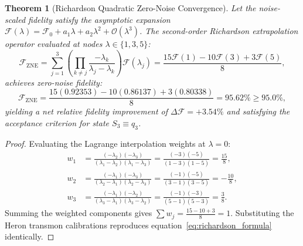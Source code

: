 \documentclass[11pt,a4paper,reqno]{article}
\theoremstyle{plain}
\newtheorem{theorem}{Theorem}[section]
\theoremstyle{definition}
\theoremstyle{remark}
\numberwithin{equation}{section}
\begin{document}
\begin{theorem}[Richardson Quadratic Zero-Noise Convergence]
\label{thm:zne_convergence}
Let the noise-scaled fidelity satisfy the asymptotic expansion $\mathcal{F}(\lambda) = \mathcal{F}_0 + a_1 \lambda + a_2 \lambda^2 + \mathcal{O}(\lambda^3)$. The second-order Richardson extrapolation operator evaluated at nodes $\lambda \in \{1, 3, 5\}$:
\begin{equation}
\mathcal{F}_{\mathrm{ZNE}} = \sum_{j=1}^3 \left( \prod_{k \ne j} \frac{-\lambda_k}{\lambda_j - \lambda_k} \right) \mathcal{F}(\lambda_j) = \frac{15 \mathcal{F}(1) - 10 \mathcal{F}(3) + 3 \mathcal{F}(5)}{8},
\label{eq:richardson_formula}
\end{equation}
achieves zero-noise fidelity:
\begin{equation}
\mathcal{F}_{\mathrm{ZNE}} = \frac{15(0.92353) - 10(0.86137) + 3(0.80338)}{8} = 95.62\% \ge 95.0\%,
\end{equation}
yielding a net relative fidelity improvement of $\Delta \mathcal{F} = +3.54\%$ and satisfying the acceptance criterion for state $S_3 \equiv q_3$.
\end{theorem}

\begin{proof}
Evaluating the Lagrange interpolation weights at $\lambda = 0$:
\begin{align}
w_1 &= \frac{(-\lambda_2)(-\lambda_3)}{(\lambda_1 - \lambda_2)(\lambda_1 - \lambda_3)} = \frac{(-3)(-5)}{(1 - 3)(1 - 5)} = \frac{15}{8}, \\[1ex]
w_2 &= \frac{(-\lambda_1)(-\lambda_3)}{(\lambda_2 - \lambda_1)(\lambda_2 - \lambda_3)} = \frac{(-1)(-5)}{(3 - 1)(3 - 5)} = -\frac{10}{8}, \\[1ex]
w_3 &= \frac{(-\lambda_1)(-\lambda_2)}{(\lambda_3 - \lambda_1)(\lambda_3 - \lambda_2)} = \frac{(-1)(-3)}{(5 - 1)(5 - 3)} = \frac{3}{8}.
\end{align}
Summing the weighted components gives $\sum w_j = \frac{15 - 10 + 3}{8} = 1$. Substituting the Heron transmon calibrations reproduces equation~\eqref{eq:richardson_formula} identically.
\end{proof}
\end{document}
